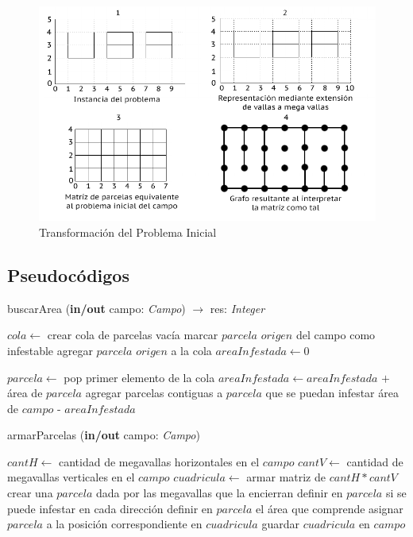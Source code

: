 \clearpage

\begin{figure}[h]
\centering                                                       
        \includegraphics[width=320pt]{./figs/mapeoParcelas.png}
	\caption{Transformación del Problema Inicial}
	\label{fig:ej2Mapeo}
\end{figure}
\clearpage

\subsection{Pseudocódigos}

\begin{algorithm}
\caption{buscarArea (\textbf{in/out} campo: \textsl{Campo}) $\rightarrow$ res: \textsl{Integer}}
\begin{algorithmic}[1]

\STATE $cola \leftarrow$ crear cola de parcelas vacía
\STATE marcar $parcela$ $origen$ del campo como infestable
\STATE agregar $parcela$ $origen$ a la cola
\STATE $areaInfestada \leftarrow 0$

	\STATE $parcela \leftarrow$ pop primer elemento de la cola
	\STATE $areaInfestada \leftarrow areaInfestada$ $+$ área de $parcela$ 
	\STATE agregar parcelas contiguas a $parcela$ que se puedan infestar
\ENDWHILE
\RETURN área de $campo$ - $areaInfestada$
\end{algorithmic}
\end{algorithm}


\begin{algorithm}
\caption{armarParcelas (\textbf{in/out} campo: \textsl{Campo})}
\begin{algorithmic}[1]

\STATE $cantH \leftarrow$ cantidad de megavallas horizontales en el $campo$
\STATE $cantV \leftarrow$ cantidad de megavallas verticales en el $campo$
\STATE $cuadricula \leftarrow$ armar matriz de $cantH*cantV$
		\STATE crear una $parcela$ dada por las megavallas que la encierran
		\STATE definir en $parcela$ si se puede infestar en cada dirección
		\STATE definir en $parcela$ el área que comprende
		\STATE asignar $parcela$ a la posición correspondiente en $cuadricula$
	\ENDWHILE
\ENDWHILE
\STATE guardar $cuadricula$ en $campo$
\end{algorithmic}
\end{algorithm}

\clearpage


